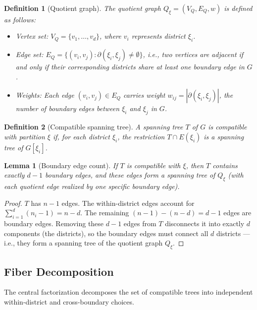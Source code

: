 \documentclass[11pt]{article}
\newtheorem{definition}{Definition}[section]
\newtheorem{lemma}{Lemma}[section]
\begin{document}
\begin{definition}[Quotient graph]\label{def:quotient}
The \emph{quotient graph} $Q_{\xi} = (V_Q, E_Q, w)$ is defined as follows:
\begin{itemize}
  \item Vertex set: $V_Q = \{v_1, \ldots, v_d\}$, where $v_i$
    represents district $\xi_i$.
  \item Edge set: $E_Q = \bigl\{(v_i, v_j) : \partial(\xi_i, \xi_j)
    \neq \emptyset\bigr\}$, i.e., two vertices are adjacent if and only if
    their corresponding districts share at least one boundary edge in $G$.
  \item Weights: Each edge $(v_i, v_j) \in E_Q$ carries weight
    $w_{ij} = |\partial(\xi_i, \xi_j)|$, the number of boundary edges between
    $\xi_i$ and $\xi_j$ in $G$.
\end{itemize}
\end{definition}

\begin{definition}[Compatible spanning tree]\label{def:compatible}
A spanning tree $T$ of $G$ is \emph{compatible} with partition $\xi$ if, for
each district $\xi_i$, the restriction $T \cap E(\xi_i)$ is a spanning tree of
$G[\xi_i]$.
\end{definition}

\begin{lemma}[Boundary edge count]\label{lem:boundary-count}
If $T$ is compatible with $\xi$, then $T$ contains exactly $d - 1$ boundary edges,
and these edges form a spanning tree of $Q_{\xi}$ (with each quotient edge realized
by one specific boundary edge).
\end{lemma}

\begin{proof}
$T$ has $n - 1$ edges. The within-district edges account for
$\sum_{i=1}^d (n_i - 1) = n - d$. The remaining $(n-1) - (n-d) = d-1$ edges
are boundary edges. Removing these $d-1$ edges from $T$ disconnects it into
exactly $d$ components (the districts), so the boundary edges must connect all
$d$ districts --- i.e., they form a spanning tree of the quotient graph $Q_{\xi}$.
\end{proof}


\subsection{Fiber Decomposition}\label{sec:fiber}

The central factorization decomposes the set of compatible trees into independent
within-district and cross-boundary choices.
\end{document}
